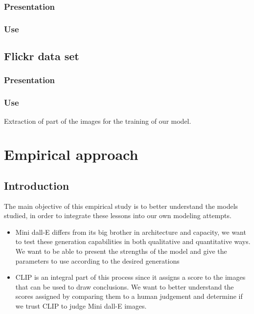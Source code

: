 \documentclass{article}
\begin{document}
\subsubsection{Presentation}

\subsubsection{Use}

\subsection{Flickr data set}

\subsubsection{Presentation}

\subsubsection{Use}

Extraction of part of the images for the training of our model.

\pagebreak

\section{Empirical approach}

\subsection{Introduction}

The main objective of this empirical study is to better understand the models studied, in order to integrate these lessons into our own modeling attempts.

\begin{itemize}
    \item Mini dall-E differs from its big brother in architecture and capacity, we want to test these generation capabilities in both qualitative and quantitative ways. We want to be able to present the strengths of the model and give the parameters to use according to the desired generations
    \item CLIP is an integral part of this process since it assigns a score to the images that can be used to draw conclusions. We want to better understand the scores assigned by comparing them to a human judgement and determine if we trust CLIP to judge Mini dall-E images.
\end{itemize}
\end{document}
